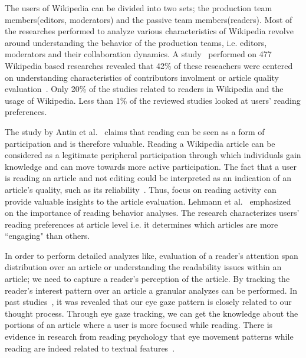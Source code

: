 \documentclass[12pt]{article}
\begin{document}
The users of Wikipedia can be divided into two sets; the production team members(editors, moderators) and the passive team members(readers). Most of the researches performed to analyze various characteristics of Wikipedia revolve around understanding the behavior of the production teams, i.e. editors, moderators and their collaboration dynamics. A study~\cite{okoli2012people} performed on 477 Wikipedia based researches revealed that 42\% of these reseachers were centered on understanding characteristics of contributors involment or article quality evaluation~\cite{wilkinson2007assessing, kittur2008harnessing, stvilia2008information}. Only 20\% of the studies related to readers in Wikipedia and the usage of Wikipedia. Less than 1\% of the reviewed studies looked at users' reading preferences.


The study by Antin et al.~\cite{antin2010readers} claims that reading can be seen as a form of participation and is therefore valuable. Reading a Wikipedia article can be considered as a legitimate peripheral participation through which individuals gain knowledge and can move towards more active participation. The fact that a user is reading an article and not editing could be interpreted as an indication of an article's quality, such as its reliability~\cite{adler2008assigning}. Thus, focus on reading activity can provide valuable insights to the article evaluation. Lehmann et al.~\cite{lehmann2014reader} emphasized on the importance of reading behavior analyses. The research characterizes users' reading preferences at article level i.e. it determines which articles are more ``engaging" than others. 


In order to perform detailed analyzes like, evaluation of a reader's attention span distribution over an article or understanding the readability issues within an article; we need to capture a reader's perception of the article. By tracking the reader's interest pattern over an article a granular analyzes can be performed. In past studies~\cite{calder2002reading, bff9c00ddce3404ca729f4a96d53a701}, it was revealed that our eye gaze pattern is closely related to our thought process. Through eye gaze tracking, we can get the knowledge about the portions of an article where a user is more focused while reading. There is evidence in research from reading psychology that eye movement patterns while reading are indeed related to textual features~\cite{rayner1978eye}.
\end{document}

